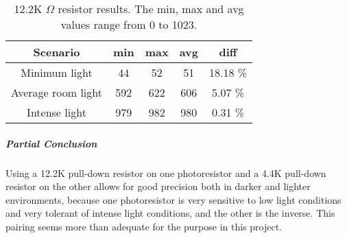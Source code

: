 \begin{table}[htbp]
  \centering
  \begin{tabular}{c c c c c}
    \toprule
    Scenario & min & max & avg & diff \\ \midrule
    Minimum light & 44 & 52 & 51 & 18.18 \% \\
    Average room light & 592 & 622 & 606 & 5.07 \% \\
    Intense light & 979 & 982 & 980 & 0.31 \% \\ \bottomrule
  \end{tabular}
  \caption[12.2K $\Omega$ resistor results]{12.2K $\Omega$ resistor results. The min, max and avg values range from 0 to 1023.}\label{tab:12.2KTestResults}
\end{table}

\subparagraph{Partial Conclusion}
Using a 12.2K pull-down resistor on one photoresistor and a 4.4K pull-down resistor on the other allows for good precision both in darker and lighter environments, because one photoresistor is very sensitive to low light conditions and very tolerant of intense light conditions, and the other is the inverse. This pairing seems more than adequate for the purpose in this project.
